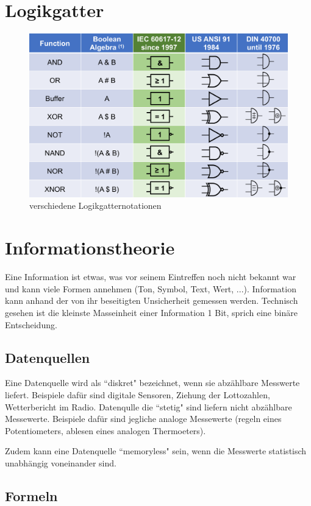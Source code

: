 \documentclass{article}
\author{Philipp Kiss}
\begin{document}
\tableofcontents
\newpage

\section{Logikgatter}
\begin{figure}[h]
		\includegraphics[width=\linewidth]{img/logikgatter.png}
		\caption{verschiedene Logikgatternotationen}
		\label{fig:verschiedene Logikgatternotationen}
\end{figure}
\section{Informationstheorie}
Eine Information ist etwas, was vor seinem Eintreffen noch nicht bekannt war und kann viele Formen annehmen (Ton, Symbol, Text, Wert, ...). Information kann anhand der von ihr beseitigten Unsicherheit gemessen werden. Technisch gesehen ist die kleinste Masseinheit einer Information 1 Bit, sprich eine binäre Entscheidung.
\subsection{Datenquellen}
Eine Datenquelle wird als ``diskret" bezeichnet, wenn sie abzählbare Messwerte liefert. Beispiele dafür sind digitale Sensoren, Ziehung der Lottozahlen, Wetterbericht im Radio. Datenqulle die ``stetig" sind liefern nicht abzählbare Messewerte. Beispiele dafür sind jegliche analoge Messewerte (regeln eines Potentiometers, ablesen eines analogen Thermoeters).

Zudem kann eine Datenquelle ``memoryless" sein, wenn die Messwerte statistisch unabhängig voneinander sind.
\subsection{Formeln}
\end{document}
